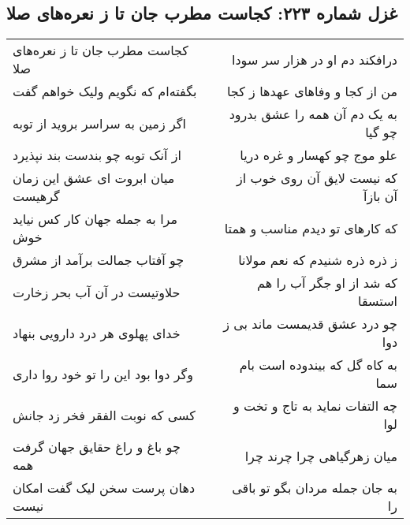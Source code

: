 \begin{center}
\section*{غزل شماره ۲۲۳: کجاست مطرب جان تا ز نعره‌های صلا}
\label{sec:0223}
\begin{longtable}{l p{0.5cm} r}
کجاست مطرب جان تا ز نعره‌های صلا
&&
درافکند دم او در هزار سر سودا
\\
بگفته‌ام که نگویم ولیک خواهم گفت
&&
من از کجا و وفاهای عهدها ز کجا
\\
اگر زمین به سراسر بروید از توبه
&&
به یک دم آن همه را عشق بدرود چو گیا
\\
از آنک توبه چو بندست بند نپذیرد
&&
علو موج چو کهسار و غره دریا
\\
میان ابروت ای عشق این زمان گرهیست
&&
که نیست لایق آن روی خوب از آن بازآ
\\
مرا به جمله جهان کار کس نیاید خوش
&&
که کارهای تو دیدم مناسب و همتا
\\
چو آفتاب جمالت برآمد از مشرق
&&
ز ذره ذره شنیدم که نعم مولانا
\\
حلاوتیست در آن آب بحر زخارت
&&
که شد از او جگر آب را هم استسقا
\\
خدای پهلوی هر درد دارویی بنهاد
&&
چو درد عشق قدیمست ماند بی ز دوا
\\
وگر دوا بود این را تو خود روا داری
&&
به کاه گل که بیندوده است بام سما
\\
کسی که نوبت الفقر فخر زد جانش
&&
چه التفات نماید به تاج و تخت و لوا
\\
چو باغ و راغ حقایق جهان گرفت همه
&&
میان زهرگیاهی چرا چرند چرا
\\
دهان پرست سخن لیک گفت امکان نیست
&&
به جان جمله مردان بگو تو باقی را
\\
\end{longtable}
\end{center}
